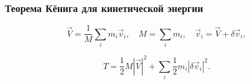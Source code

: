 \documentclass[12pt, a4paper]{article}
\begin{document}
\subsubsection*{Теорема Кёнига для кинетической энергии}

\[
\vec V = \frac{1}{M}\sum_i m_i\vec v_i, \quad M = \sum_i m_i,
\quad
\vec v_i = \vec V + \delta\vec v_i,
\]

\[
T = \frac12 M |\vec V|^2 + \sum_i \frac12 m_i |\delta \vec v_i|^2.
\]
\end{document}
